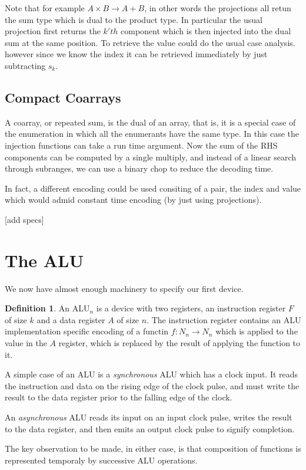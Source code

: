 \documentclass[oneside]{book}
\theoremstyle{plain}
\theoremstyle{definition}
\newtheorem{definition}{Definition}
\theoremstyle{plain}
\begin{document}
Note that for example $A \times B \rightarrow A + B$, in other words the
projections all retun the sum type which is dual to the product type.
In particular the usual projection first returns the $k'th$ component 
which is then injected into the dual sum at the same position.
To retrieve the value could do the usual case analysis. however
since we know the index it can be retrieved immediately by
just subtracting $s_k$.


\subsection{Compact Coarrays}
A coarray, or repeated sum, is the dual of an array, that is,
it is a special case of the enumeration in which all the
enumerants have the same type. In this case the injection
functions can take a run time argument.  Now the sum of the
RHS components can be computed by a single multiply, and
instead of a linear search through subranges, we can 
use a binary chop to reduce the decoding time.

In fact, a different encoding could be used consiting of
a pair, the index and value which would admid constant
time encoding (by just using projections).

[add specs]

\section{The ALU}
We now have almost enough machinery to specify our first device.
\begin{definition}
An $\mathrm {ALU}_n$ is a device with two registers, an instruction register $F$
of size $k$
and a data register $A$ of size $n$. The instruction register contains an ALU implementation
specific encoding of a functin $f:N_n\rightarrow N_n$ which is applied to the 
value in the $A$ register, which is replaced by the result of applying the function to it.
\end{definition}

A simple case of an ALU is a {\em synchronous} ALU which has a clock input.
It reads the instruction and data on the rising edge of the clock pulse,
and must write the result to the data register prior to the falling edge
of the clock.

An {\em asynchronous} ALU reads its input on an input clock pulse, writes
the result to the data register, and then emits an output clock pulse to
signify completion.

The key observation to be made, in either case, is that composition of functions is represented
temporaly by successive ALU operations.
\end{document}
